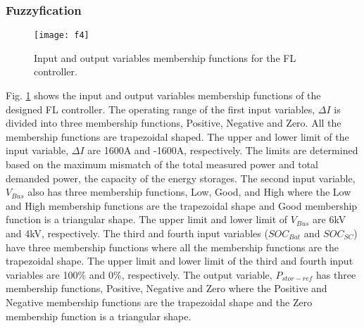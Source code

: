 \subsubsection{Fuzzyfication}
\begin{figure}[ht!]
\centering
\texttt{[image: f4]}
\caption{Input and output variables membership functions for the FL controller.}
\label{sec3_f4}
\end{figure}
Fig. \ref{sec3_f4} shows the input and output variables membership functions of the designed FL controller. The operating range of the first input variables, $\Delta I$ is divided into three membership functions, Positive, Negative and Zero. All the membership functions are trapezoidal shaped. The upper and lower limit of the input variable, $\Delta I$ are 1600A and -1600A, respectively. The limits are determined based on the maximum mismatch of the total measured power and total demanded power, the capacity of the energy storages. The second input variable, $V_{Bus}$ also has three membership functions, Low, Good, and High where the Low and High membership functions are the trapezoidal shape and Good membership function is a triangular shape. The upper limit and lower limit of $V_{Bus}$ are  6kV and 4kV, respectively. The third and fourth input variables ($SOC_{Bat}$ and $SOC_{SC}$) have three membership functions where all the membership functions are the trapezoidal shape. The upper limit and lower limit of the third and fourth input variables are 100\% and 0\%, respectively. The output variable, $P_{stor-ref}$ has three membership functions, Positive, Negative and Zero where the Positive and Negative membership functions are the trapezoidal shape and the Zero membership function is a triangular shape.

